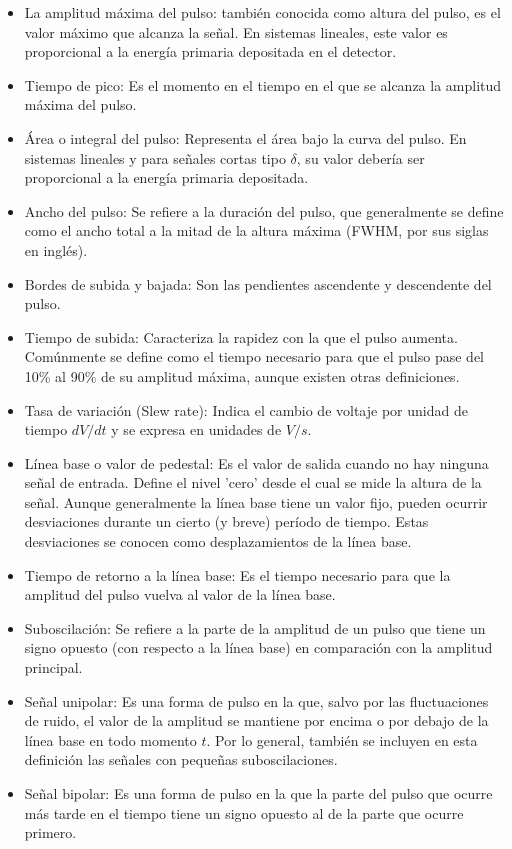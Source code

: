 \documentclass{report}
\begin{document}
\begin{itemize}
    \item La amplitud máxima del pulso: también conocida como altura del pulso, es el valor máximo que alcanza la señal. En sistemas lineales, este valor es proporcional a la energía primaria depositada en el detector.
    \item Tiempo de pico: Es el momento en el tiempo en el que se alcanza la amplitud máxima del pulso.
    \item Área o integral del pulso: Representa el área bajo la curva del pulso. En sistemas lineales y para señales cortas tipo $\delta$, su valor debería ser proporcional a la energía primaria depositada.
    \item Ancho del pulso: Se refiere a la duración del pulso, que generalmente se define como el ancho total a la mitad de la altura máxima (FWHM, por sus siglas en inglés).
    \item Bordes de subida y bajada: Son las pendientes ascendente y descendente del pulso.
    \item Tiempo de subida: Caracteriza la rapidez con la que el pulso aumenta. Comúnmente se define como el tiempo necesario para que el pulso pase del 10\% al 90\% de su amplitud máxima, aunque existen otras definiciones.
    \item Tasa de variación (Slew rate): Indica el cambio de voltaje por unidad de tiempo $dV/dt$ y se expresa en unidades de $V/s$.
    \item Línea base o valor de pedestal: Es el valor de salida cuando no hay ninguna señal de entrada. Define el nivel 'cero' desde el cual se mide la altura de la señal. Aunque generalmente la línea base tiene un valor fijo, pueden ocurrir desviaciones durante un cierto (y breve) período de tiempo. Estas desviaciones se conocen como desplazamientos de la línea base.
    \item Tiempo de retorno a la línea base: Es el tiempo necesario para que la amplitud del pulso vuelva al valor de la línea base.
    \item Suboscilación: Se refiere a la parte de la amplitud de un pulso que tiene un signo opuesto (con respecto a la línea base) en comparación con la amplitud principal.
    \item Señal unipolar: Es una forma de pulso en la que, salvo por las fluctuaciones de ruido, el valor de la amplitud se mantiene por encima o por debajo de la línea base en todo momento $t$. Por lo general, también se incluyen en esta definición las señales con pequeñas suboscilaciones.
    \item Señal bipolar: Es una forma de pulso en la que la parte del pulso que ocurre más tarde en el tiempo tiene un signo opuesto al de la parte que ocurre primero.
\end{itemize}
\end{document}
